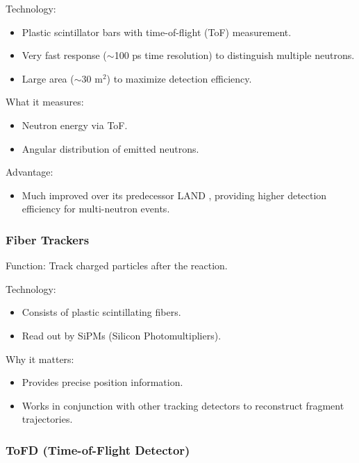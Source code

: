 Technology:

\begin{itemize}
	\item Plastic scintillator bars with time-of-flight (ToF) measurement.
	\item Very fast response ($\sim$100 ps time resolution) to distinguish multiple neutrons.
	\item Large area ($\sim$30 m$^2$) to maximize detection efficiency.
\end{itemize}

What it measures:

\begin{itemize}
	\item Neutron energy via ToF.
	\item Angular distribution of emitted neutrons.
\end{itemize}

Advantage:

\begin{itemize}
	\item Much improved over its predecessor LAND \cite{blaich_large_1992}, providing higher detection efficiency for multi-neutron events.
\end{itemize}


\subsubsection{Fiber Trackers}

Function: Track charged particles after the reaction.

Technology:

\begin{itemize}
	\item Consists of plastic scintillating fibers.
	\item Read out by SiPMs (Silicon Photomultipliers).
\end{itemize}

Why it matters:

\begin{itemize}
	\item Provides precise position information.
	\item Works in conjunction with other tracking detectors to reconstruct fragment trajectories.
\end{itemize}


\subsubsection{ToFD (Time-of-Flight Detector)}

